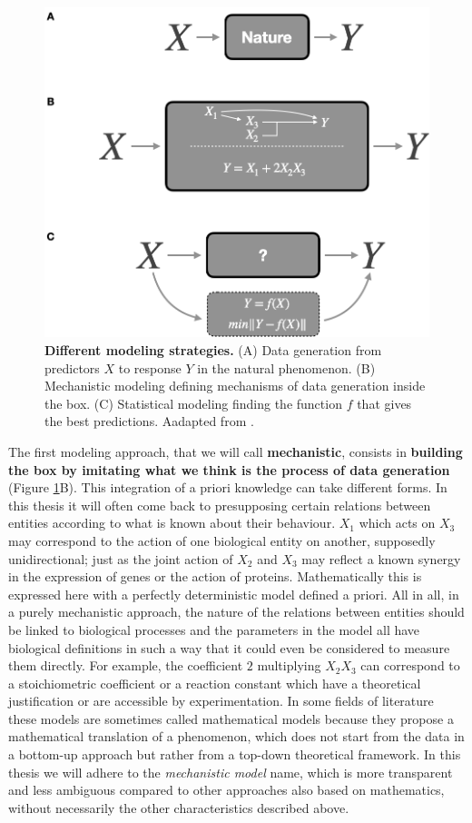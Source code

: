 \documentclass[a4paper,12pt,twoside,onecolumn,openright,final,oldfontcommands]{memoir}
\begin{document}
\begin{figure}

{\centering \includegraphics[width=0.6\linewidth]{fig/boxes} 

}

\caption[Different modeling strategies.]{\textbf{Different modeling strategies.} (A) Data
generation from predictors \(X\) to response \(Y\) in the natural
phenomenon. (B) Mechanistic modeling defining mechanisms of data
generation inside the box. (C) Statistical modeling finding the function
\(f\) that gives the best predictions. Aadapted from
\citet{breiman2001statistical}.}\label{fig:boxes}
\end{figure}








The first modeling approach, that we will call \textbf{mechanistic},
consists in \textbf{building the box by imitating what we think is the
process of data generation} (Figure \ref{fig:boxes}B). This integration
of a priori knowledge can take different forms. In this thesis it will
often come back to presupposing certain relations between entities
according to what is known about their behaviour. \(X_1\) which acts on
\(X_3\) may correspond to the action of one biological entity on
another, supposedly unidirectional; just as the joint action of \(X_2\)
and \(X_3\) may reflect a known synergy in the expression of genes or
the action of proteins. Mathematically this is expressed here with a
perfectly deterministic model defined a priori. All in all, in a purely
mechanistic approach, the nature of the relations between entities
should be linked to biological processes and the parameters in the model
all have biological definitions in such a way that it could even be
considered to measure them directly. For example, the coefficient \(2\)
multiplying \(X_2X_3\) can correspond to a stoichiometric coefficient or
a reaction constant which have a theoretical justification or are
accessible by experimentation. In some fields of literature these models
are sometimes called mathematical models because they propose a
mathematical translation of a phenomenon, which does not start from the
data in a bottom-up approach but rather from a top-down theoretical
framework. In this thesis we will adhere to the \emph{mechanistic model}
name, which is more transparent and less ambiguous compared to other
approaches also based on mathematics, without necessarily the other
characteristics described above.
\end{document}
